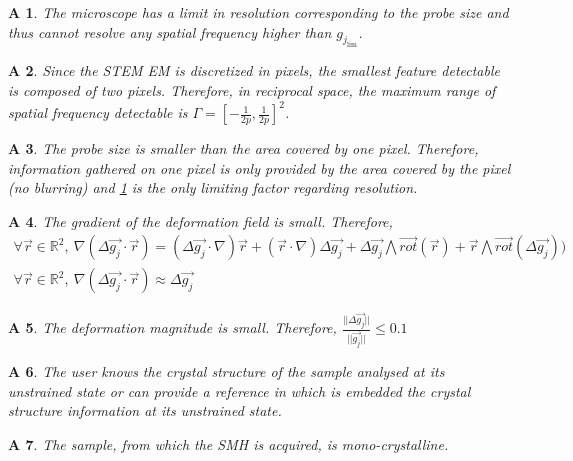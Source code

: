 \documentclass[12pt]{article}
\newtheorem{A}{A}
\begin{document}
\begin{A}
\normalfont The microscope has a limit in resolution corresponding to the probe size and thus cannot resolve any spatial frequency higher than $g_{j_{\text{lim}}}$. 
\label{A_1}
\end{A}
\begin{A}
\normalfont Since the STEM EM is discretized in pixels, the smallest feature detectable is composed of two pixels. Therefore, in reciprocal space, the maximum range of spatial frequency detectable is $\Gamma=[-\frac{1}{2p},\frac{1}{2p}]^{2}$.
\label{A_2}
\end{A}
\begin{A}
\normalfont The probe size is smaller than the area covered by one pixel. Therefore, information gathered on one pixel is only provided by the area covered by the pixel (no blurring) and \cref{A_1} is the only limiting factor regarding resolution.
\label{A_3}
\end{A}
\begin{A}
\label{A_4}
\normalfont The gradient of the deformation field is small. Therefore,
\begin{equation*}
\begin{gathered}
\forall \vec{r} \in \mathbb{R}^2, \ \nabla (\Delta\overrightarrow{g_j}\cdot\vec{r})= (\Delta\overrightarrow{g_j}\cdot\nabla)\vec{r}+(\vec{r}\cdot\nabla)\Delta\overrightarrow{g_j}+\Delta\overrightarrow{g_j}\bigwedge \overrightarrow{\mathit{rot}}(\vec{r})+\vec{r}\bigwedge \overrightarrow{\mathit{rot}}(\Delta\overrightarrow{g_j}))\\
\forall \vec{r} \in \mathbb{R}^2, \ \nabla (\Delta\overrightarrow{g_j}\cdot\vec{r})\approx \Delta\overrightarrow{g_j}
\end{gathered}
\end{equation*}
\end{A}
\begin{A}
\label{A_5}
\normalfont The deformation magnitude is small. Therefore, $\frac{||\Delta\overrightarrow{g_j} ||}{||\overrightarrow{g_j} ||}\leq 0.1$
\end{A}
\begin{A}
\label{A_6}
\normalfont The user knows the crystal structure of the sample analysed at its unstrained state or can provide a reference in which is embedded the crystal structure information at its unstrained state.
\end{A}
\begin{A}
\label{A_7}
\normalfont The sample, from which the SMH is acquired, is mono-crystalline.
\end{A}
\end{document}

